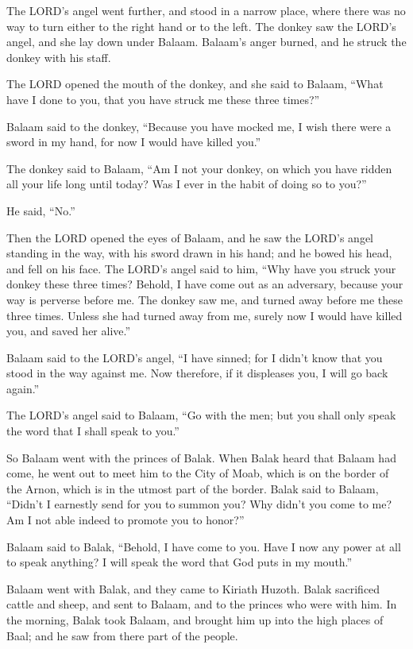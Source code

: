 \myverse{}The LORD’s angel went further, and stood in a narrow place,
where there was no way to turn either to the right hand or to the left.
\myverse{}The donkey saw the LORD’s angel, and she lay down under Balaam. Balaam’s
anger burned, and he struck the donkey with his staff.


\myverse{}The LORD opened the mouth of the donkey, and she said to Balaam,
“What have I done to you, that you have struck me these three times?”


\myverse{}Balaam said to the donkey, “Because you have mocked me, I wish
there were a sword in my hand, for now I would have killed you.”


\myverse{}The donkey said to Balaam, “Am I not your donkey, on which you
have ridden all your life long until today? Was I ever in the habit of doing so to you?”

He said, “No.”


\myverse{}Then the LORD opened the eyes of Balaam, and he saw the LORD’s
angel standing in the way, with his sword drawn in his hand; and he bowed his head, and fell on his face.
\myverse{}The LORD’s angel said to him, “Why have you struck your donkey these three
times? Behold, I have come out as an adversary, because your way is perverse before me.
\myverse{}The donkey saw me, and turned away before me these three times. Unless she
had turned away from me, surely now I would have killed you, and saved her alive.”


\myverse{}Balaam said to the LORD’s angel, “I have sinned; for I didn’t
know that you stood in the way against me. Now therefore, if it displeases you, I will go back again.”


\myverse{}The LORD’s angel said to Balaam, “Go with the men; but you shall
only speak the word that I shall speak to you.”

So Balaam went with the princes of Balak.
\myverse{}When Balak heard that Balaam had come, he went out to meet him to the City
of Moab, which is on the border of the Arnon, which is in the utmost part of the border.
\myverse{}Balak said to Balaam, “Didn’t I earnestly send for you to summon you? Why
didn’t you come to me? Am I not able indeed to promote you to honor?”


\myverse{}Balaam said to Balak, “Behold, I have come to you. Have I now
any power at all to speak anything? I will speak the word that God puts in my mouth.”


\myverse{}Balaam went with Balak, and they came to Kiriath Huzoth.
\myverse{}Balak sacrificed cattle and sheep, and sent to Balaam, and to the princes
who were with him.
\myverse{}In the morning, Balak took Balaam, and brought him up into the high places
of Baal; and he saw from there part of the people.


